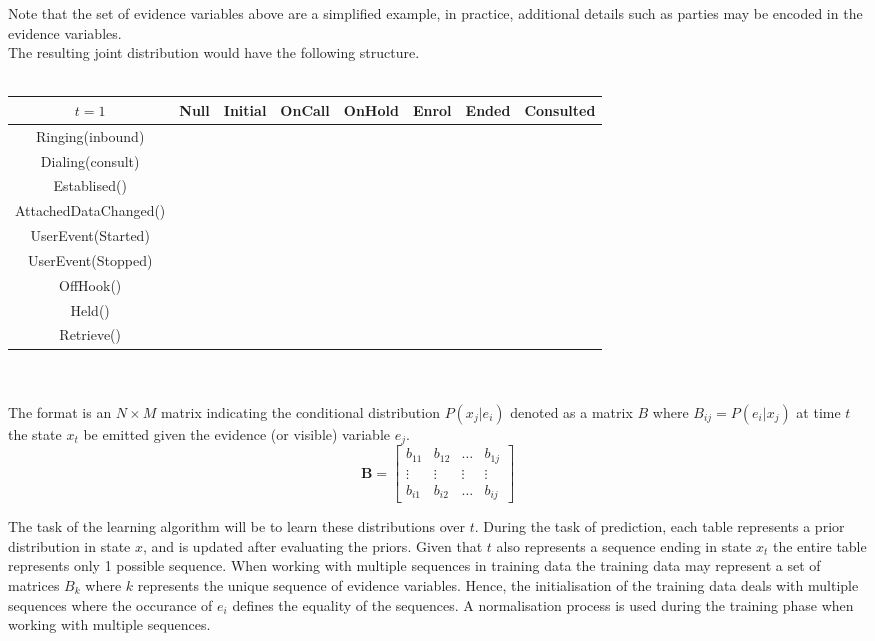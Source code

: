 \documentclass[11pt]{article}
\begin{document}
Note that the set of evidence variables above are a simplified example, in practice, additional details such as parties may be encoded in the evidence variables.\\
The resulting joint distribution would have the following structure.
\\\\
\begin{tabular}{|c|c|c|c|c|c|c|c|}
\hline
$t=1$ & Null & Initial & OnCall & OnHold & Enrol & Ended & Consulted \\
\hline
Ringing(inbound) & & & & & & & \\
\hline 
Dialing(consult) & & & & & & & \\
\hline 
Establised() & & & & & & & \\
\hline 
AttachedDataChanged() & & & & & & & \\
\hline
UserEvent(Started) & & & & & & & \\
\hline
UserEvent(Stopped) & & & & & & & \\
\hline
OffHook() & & & & & & & \\
\hline
Held() & & & & & & & \\
\hline
Retrieve() & & & & & & & \\
\hline
\end{tabular}
\\\\
The format is an $N \times M$ matrix indicating the conditional distribution $P(x_j | e_i)$ denoted as a matrix $B$ where $B_{ij} = P(e_i | x_j )$ at time $t$ the state $x_t$ be emitted given the evidence (or visible) variable $e_j$. \cite{pc}
\begin{equation*}
    \mathbf{B} = \left[
    \begin{array}{cccc}
    b_{11} & b_{12} & \ldots & b_{1j} \\
    \vdots & \vdots & \vdots & \vdots \\
    b_{i1} & b_{i2} & \ldots & b_{ij}
   
    \end{array}
    \right]
\end{equation*}

The task of the learning algorithm will be to learn these distributions over $t$. During the task of prediction, each table represents a prior distribution in state $x$, and is updated after evaluating the priors. 
Given that $t$ also represents a sequence ending in state $x_t$ the entire table represents only 1 possible sequence.
When working with multiple sequences in training data the training data may represent a set of matrices $B_k$ where $k$ represents the unique sequence of evidence variables. Hence, the initialisation of the training data deals with multiple sequences where the occurance of $e_i$ defines the equality of the sequences. A normalisation process is used during the training phase when working with multiple sequences. 
\end{document}
